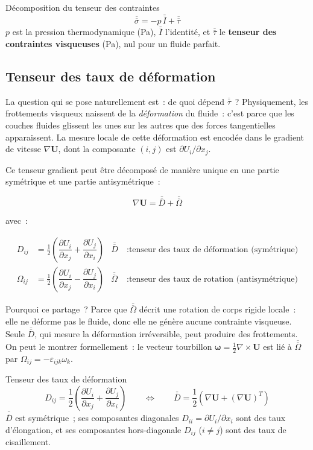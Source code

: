 \documentclass[11pt,a4paper]{report}
\newcommand{\pd}[2]{\dfrac{\partial #1}{\partial #2}}
\newcommand{\ten}[1]{\overline{\overline{#1}}}   %
\begin{document}
\begin{defbox}{Décomposition du tenseur des contraintes}
\[
    \ten{\sigma} = -p\,\ten{I} + \ten{\tau}
\]
$p$ est la pression thermodynamique (Pa), $\ten{I}$ l'identité, et $\ten{\tau}$
le \textbf{tenseur des contraintes visqueuses} (Pa), nul pour un fluide parfait.
\end{defbox}

\subsection{Tenseur des taux de déformation}

La question qui se pose naturellement est~: de quoi dépend $\ten{\tau}$~?
Physiquement, les frottements visqueux naissent de la \emph{déformation} du fluide~:
c'est parce que les couches fluides glissent les unes sur les autres que des forces
tangentielles apparaissent. La mesure locale de cette déformation est encodée dans
le gradient de vitesse $\nabla\bm{U}$, dont la composante $(i,j)$ est
$\partial U_i/\partial x_j$.

Ce tenseur gradient peut être décomposé de manière unique en une partie symétrique
et une partie antisymétrique~:

\begin{equation}
    \nabla\bm{U} = \ten{D} + \ten{\Omega}
\end{equation}

avec~:

\begin{align}
    D_{ij} &= \frac{1}{2}\left(\pd{U_i}{x_j} + \pd{U_j}{x_i}\right)
    & \ten{D} &~: \text{tenseur des taux de déformation (symétrique)} \\[6pt]
    \Omega_{ij} &= \frac{1}{2}\left(\pd{U_i}{x_j} - \pd{U_j}{x_i}\right)
    & \ten{\Omega} &~: \text{tenseur des taux de rotation (antisymétrique)}
\end{align}

Pourquoi ce partage~? Parce que $\ten{\Omega}$ décrit une rotation de corps rigide
locale~: elle ne déforme pas le fluide, donc elle ne génère aucune contrainte
visqueuse. Seule $\ten{D}$, qui mesure la déformation irréversible, peut produire
des frottements. On peut le montrer formellement~: le vecteur tourbillon
$\bm{\omega} = \frac{1}{2}\nabla\times\bm{U}$ est lié à $\ten{\Omega}$ par
$\Omega_{ij} = -\varepsilon_{ijk}\omega_k$.

\begin{defbox}{Tenseur des taux de déformation}
\[
    D_{ij} = \frac{1}{2}\left(\pd{U_i}{x_j} + \pd{U_j}{x_i}\right)
    \qquad \Longleftrightarrow \qquad
    \ten{D} = \frac{1}{2}\left(\nabla\bm{U} + (\nabla\bm{U})^T\right)
\]
$\ten{D}$ est symétrique~; ses composantes diagonales $D_{ii} = \partial U_i/\partial x_i$
sont des taux d'élongation, et ses composantes hors-diagonale $D_{ij}$ ($i\neq j$) sont
des taux de cisaillement.
\end{defbox}
\end{document}
